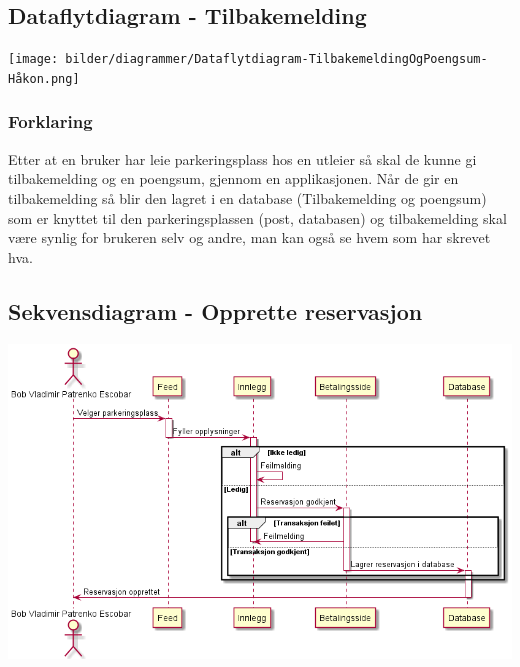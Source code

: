 \documentclass[12pt]{article}
\begin{document}
    \subsection{Dataflytdiagram - Tilbakemelding}
    \texttt{[image: bilder/diagrammer/Dataflytdiagram-TilbakemeldingOgPoengsum-Håkon.png]}
        \subsubsection{Forklaring}
        Etter at en bruker har leie parkeringsplass hos en utleier så skal de kunne gi tilbakemelding og en poengsum, gjennom en applikasjonen. Når de gir en tilbakemelding så blir den lagret i en database (Tilbakemelding og poengsum) som er knyttet til den parkeringsplassen (post, databasen) og tilbakemelding skal være synlig for brukeren selv og andre, man kan også se hvem som har skrevet hva.

    \subsection{Sekvensdiagram - Opprette reservasjon}
    \includegraphics[max width=\textwidth]{bilder/diagrammer/opprette reservasjon_sekvensdiagram.png}
\end{document}

